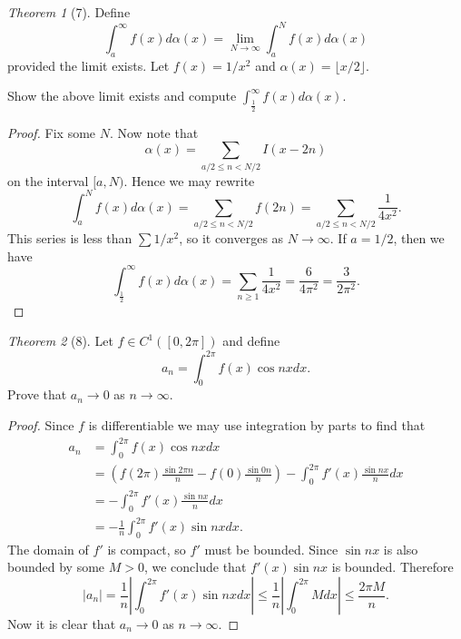 \documentclass[12pt]{article}
\theoremstyle{remark}
\theoremstyle{named}
\newtheorem*{theorem}{Theorem}
\renewcommand{\a}{\alpha}
\newcommand{\abs}[1]{|#1|}
\newcommand{\bigabs}[1]{\left|#1\right|}
\begin{document}
\begin{theorem}[7]
    Define 
    \[\int_a^{\infty} f(x) d\a(x) = \lim_{N \to \infty}\int_a^{N} f(x) d\a(x)\]
    provided the limit exists. Let \(f(x) = 1 / x^2\) and \(\a(x) = \lfloor x/2\rfloor\).

    Show the above limit exists and compute \(\int_\frac{1}{2}^{\infty} f(x) d\a(x)\).
\end{theorem}

\begin{proof}
    Fix some \(N\). Now note that \[\a(x) = \sum_{a/2 \le n < N/2} I(x - 2n)\] on the interval \([a, N)\). Hence we may rewrite 
    \[\int_a^{N} f(x) d\a(x) = \sum_{a/2 \le n < N/2} f(2n) = \sum_{a/2 \le n < N/2} \frac{1}{4x^2}.\]
    This series is less than \(\sum 1/x^2\), so it converges as \(N \to \infty\). If \(a = 1/2\), then we have 
    \[\int_{\frac{1}{2}}^{\infty} f(x) d\a(x) = \sum_{n \ge 1} \frac{1}{4x^2} = \frac{6}{4\pi^2} = \frac{3}{2\pi^2}.\]
\end{proof}

\begin{theorem}[8]
    Let \(f \in C^1([0, 2\pi])\) and define 
    \[a_n = \int_0^{2\pi}f(x)\cos nx dx.\]
    Prove that \(a_n \to 0\) as \(n \to \infty\).
\end{theorem}

\begin{proof}
    Since \(f\) is differentiable we may use integration by parts to find that 
    \begin{align*}
        a_n &= \int_0^{2\pi}f(x)\cos nx dx \\
        &= \left(f(2\pi)\frac{\sin 2\pi n}{n} - f(0)\frac{\sin 0 n}{n}\right) - \int_0^{2\pi} f'(x) \frac{\sin n x}{n} dx \\
        &= - \int_0^{2\pi} f'(x) \frac{\sin n x}{n} dx \\
        &= -\frac{1}{n}\int_0^{2\pi} f'(x) \sin n x dx.
    \end{align*}
    The domain of \(f'\) is compact, so \(f'\) must be bounded. Since \(\sin nx\) is also bounded by some \(M > 0\), we conclude that \(f'(x) \sin nx\) is bounded. Therefore
    \[\abs{a_n} = \frac{1}{n} \bigabs{\int_0^{2\pi} f'(x) \sin n x dx} \le \frac{1}{n}\bigabs{\int_0^{2\pi}Mdx} \le \frac{2\pi M}{n}.\]
    Now it is clear that \(a_n \to 0\) as \(n \to \infty\).
\end{proof}
\end{document}
